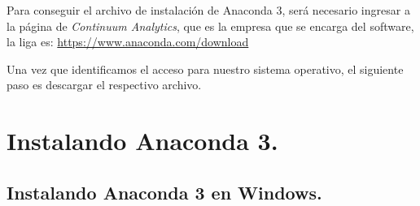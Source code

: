 \documentclass[12pt]{article}
\begin{document}
Para conseguir el archivo de instalación de Anaconda 3, será necesario ingresar a la página de \emph{Continuum Analytics}, que es la empresa que se encarga del software, la liga es: \url{https://www.anaconda.com/download}
\par
Una vez que identificamos el acceso para nuestro sistema operativo, el siguiente paso es descargar el respectivo archivo.

\section{Instalando Anaconda 3.}

\subsection{Instalando Anaconda 3 en Windows.}
\end{document}
